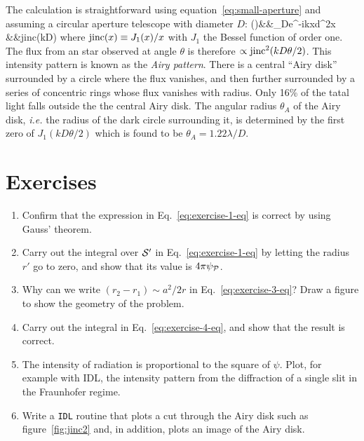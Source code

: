 The calculation is straightforward using equation~\ref{eq:small-aperture} and assuming a circular
aperture telescope with diameter $D$:
\bua
\psi(\theta)&\propto&\int_{\pi D}e^{-ik{\bm x}\cdot{\bm\theta}}d^2x \\
            &\propto&{\rm jinc}\left({kD\theta{}}\right)
\eua
where ${\rm jinc}(x)\equiv {J_1(x)/x}$ with $J_1$ the Bessel function of order one. The
flux from an star observed at angle $\theta$ is therefore $\propto{\rm jinc}^2({kD\theta/2})$.
This intensity pattern is known as the {\it Airy pattern}. There is a central ``Airy disk'' 
surrounded by a circle where the flux vanishes, and then further surrounded by a series of 
concentric rings whose flux vanishes with radius. Only 16\% of the tatal light falls outside
the the central Airy disk. The angular radius $\theta_A$ of the Airy disk, {\it i.e.} the 
radius of the dark circle surrounding it, is determined by the first zero of 
$J_1({kD\theta/2})$ which is found to be $\theta_A={1.22\lambda/D}$. 

\section{Exercises}

\begin{enumerate}
	\item Confirm that the expression in Eq.~\ref{eq:exercise-1-eq} is correct by using Gauss'
		theorem.
	\item Carry out the integral over ${\cal S}'$ in Eq.~\ref{eq:exercise-1-eq} by letting the
		radius $r'$ go to zero, and show that
		its value is $4\pi\psi_{{\cal P}}$.
	\item Why can we write $(r_2-r_1)\sim a^2/2r$ in Eq.~\ref{eq:exercise-3-eq}?
	Draw a figure to show
  the geometry of the problem.
	\item Carry out the integral %
	in Eq.~\ref{eq:exercise-4-eq}, and show that the result is correct. 
	\item The intensity of radiation is proportional to the square of
  $\psi$. Plot, for example with {\sc IDL}, the intensity pattern from
  the diffraction of a single slit in the Fraunhofer regime.
	\item Write a {\tt IDL} routine that plots a cut through the Airy disk such as figure~\ref{fig:jinc2}
and, in addition, plots an image of the Airy disk.
\end{enumerate}
